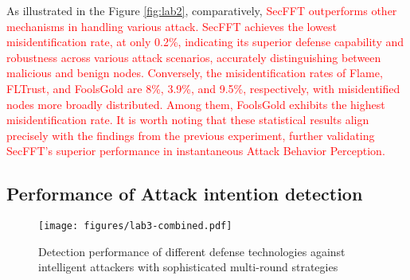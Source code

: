 \documentclass[lettersize,journal]{IEEEtran}
\begin{document}
As illustrated in the Figure \ref{fig:lab2}, comparatively, \textcolor{red}{SecFFT outperforms other mechanisms in handling various attack. SecFFT achieves the lowest misidentification rate, at only 0.2\%, indicating its superior defense capability and robustness across various attack scenarios, accurately distinguishing between malicious and benign nodes. Conversely, the misidentification rates of Flame, FLTrust, and FoolsGold are 8\%, 3.9\%, and 9.5\%, respectively, with misidentified nodes more broadly distributed. Among them, FoolsGold exhibits the highest misidentification rate. It is worth noting that these statistical results align precisely with the findings from the previous experiment, further validating SecFFT's superior performance in instantaneous Attack Behavior Perception.}

\vspace{-0.28cm}
\subsection{Performance of Attack intention detection}

\begin{figure*}[!t]
    \centering
    \texttt{[image: figures/lab3-combined.pdf]}
    \caption{Detection performance of different defense technologies against intelligent attackers with sophisticated multi-round strategies}
    \label{fig:lab3}
\end{figure*}
\end{document}
